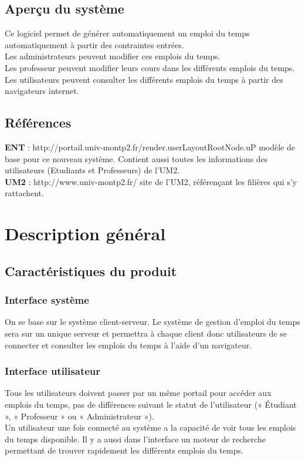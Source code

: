 \documentclass[a4paper, 11pt]{article}
\begin{document}
        \subsection{ Aperçu du système}
	Ce logiciel permet de générer automatiquement un emploi du temps automatiquement à partir des contraintes entrées.\\
	Les administrateurs peuvent modifier ces emplois du temps.\\
	Les professeur peuvent modifier leurs cours dans les différents emplois du temps.\\
	Les utilisateurs peuvent consulter les différents emplois du temps à partir des navigateurs internet.
        \subsection{ Références}
        \textbf{ENT} : http://portail.univ-montp2.fr/render.userLayoutRootNode.uP modèle de base pour ce nouveau système. Contient aussi toutes les informations des utilisateurs (Etudiants et Professeurs) de l'UM2.
        \\\textbf{UM2} : http://www.univ-montp2.fr/ site de l'UM2, référençant les filières qui s'y rattachent.
        \clearpage
        \section{ Description général}
        \subsection{ Caractéristiques du produit}
        \subsubsection{ Interface système}
	On se base sur le système client-serveur. Le système de gestion d'emploi du temps sera sur un unique serveur et permettra à chaque client donc utilisateurs de se connecter et consulter les emplois du temps à l'aide d'un navigateur.
        \subsubsection{ Interface utilisateur}
        Tous les utilisateurs doivent passer par un même portail pour accéder aux emplois du temps, pas de différences suivant le statut de l'utilisateur (« Étudiant », « Professeur » ou « Administrateur »).\\
	Un utilisateur une fois connecté au système a la capacité de voir tous les emplois du temps disponible. Il y a aussi dans l'interface un moteur de recherche permettant de trouver rapidement les différents emplois du temps.\\
\end{document}
